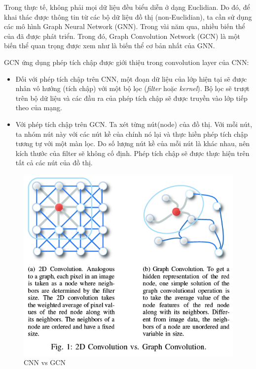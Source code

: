Trong thực tế, không phải mọi dữ liệu đều biểu diễn ở dạng Euclidian. Do đó, để khai thác được thông tin từ các bộ dữ liệu đồ thị (non-Euclidian), ta cần sử dụng các mô hình Graph Neural Network (GNN). Trong vài năm qua, nhiều biến thể của đã được phát triển. Trong đó, Graph Convolution Network (GCN) là một biến thể quan trọng được xem như là biến thể cơ bản nhất của GNN.

GCN ứng dụng phép tích chập được giới thiệu trong convolution layer của CNN:
\begin{itemize}
	\item Đối với phép tích chập trên CNN, một đoạn dữ liệu của lớp hiện tại sẽ được nhân vô hướng (tích chập) với một bộ lọc (\textit{filter} hoặc \textit{kernel}). Bộ lọc sẽ trượt trên bộ dữ liệu và các đầu ra của phép tích chập sẽ được truyền vào lớp tiếp theo của mạng.
	\item Với phép tích chập trên GCN. Ta xét từng nút(node) của đồ thị. Với mỗi nút, ta nhóm nút này với các nút kề của chính nó lại và thực hiền phép tích chập tương tự với một màn lọc. Do số lượng nút kề của mỗi nút là khác nhau, nên kích thước của filter sẽ không cố định. Phép tích chập sẽ được thực hiện trên tất cả các nút của đồ thị.
\end{itemize}

\begin{figure}[H]
    \begin{center}
        \includegraphics[scale=0.6]{images/cnn-vs-gcn}
        \caption{CNN vs GCN}
        \label{fig:cnn-vs-gcn}
    \end{center}
\end{figure}


